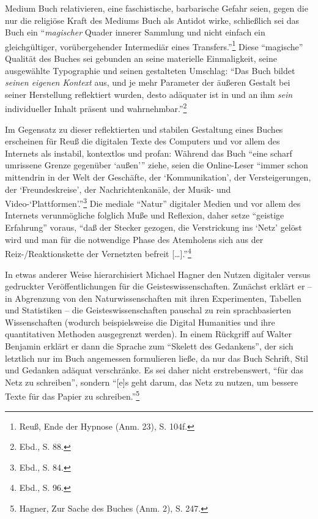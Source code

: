 \documentclass[a4paper,
fontsize=11pt,
oneside,
numbers=noperiodatend,
parskip=half-,
bibliography=totoc,
final
]{scrartcl}
\begin{document}
Medium Buch relativieren, eine faschistische, barbarische Gefahr seien,
gegen die nur die religiöse Kraft des Mediums Buch als Antidot wirke,
schließlich sei das Buch ein \enquote{\emph{magischer} Quader innerer
Sammlung und nicht einfach ein gleichgültiger, vorübergehender
Intermediär eines Transfers.}\footnote{Reuß, Ende der Hypnose (Anm. 23),
  S. 104f.} Diese \enquote{magische} Qualität des Buches sei gebunden an
seine materielle Einmaligkeit, seine ausgewählte Typographie und seinen
gestalteten Umschlag: \enquote{Das Buch bildet \emph{seinen eigenen
Kontext} aus, und je mehr Parameter der äußeren Gestalt bei seiner
Herstellung reflektiert wurden, desto adäquater ist in und an ihm
\emph{sein} individueller Inhalt präsent und wahrnehmbar.}\footnote{Ebd.,
  S. 88.}

Im Gegensatz zu dieser reflektierten und stabilen Gestaltung eines
Buches erscheinen für Reuß die digitalen Texte des Computers und vor
allem des Internets als instabil, kontextlos und profan: Während das
Buch \enquote{eine scharf umrissene Grenze gegenüber \enquote{außen}}
ziehe, seien die Online-Leser \enquote{immer schon mittendrin in der
Welt der Geschäfte, der \enquote{Kommunikation}, der Versteigerungen,
der \enquote{Freundeskreise}, der Nachrichtenkanäle, der Musik- und
Video-\enquote{Plattformen}.}\footnote{Ebd., S. 84.} Die mediale
\enquote{Natur} digitaler Medien und vor allem des Internets
verunmögliche folglich Muße und Reflexion, daher setze \enquote{geistige
Erfahrung} voraus, \enquote{daß der Stecker gezogen, die Verstrickung
ins \enquote{Netz} gelöst wird und man für die notwendige Phase des
Atemholens sich aus der Reiz-/Reaktionskette der Vernetzten befreit
{[}\ldots{}{]}.}\footnote{Ebd., S. 96.}

In etwas anderer Weise hierarchisiert Michael Hagner den Nutzen
digitaler versus gedruckter Veröffentlichungen für die
Geisteswissenschaften. Zunächst erklärt er -- in Abgrenzung von den
Naturwissenschaften mit ihren Experimenten, Tabellen und Statistiken --
die Geisteswissenschaften pauschal zu rein sprachbasierten
Wissenschaften (wodurch beispielsweise die Digital Humanities und ihre
quantitativen Methoden ausgegrenzt werden). In einem Rückgriff auf
Walter Benjamin erklärt er dann die Sprache zum \enquote{Skelett des
Gedankens}, der sich letztlich nur im Buch angemessen formulieren ließe,
da nur das Buch Schrift, Stil und Gedanken adäquat verschränke. Es sei
daher nicht erstrebenswert, \enquote{für das Netz zu schreiben}, sondern
\enquote{{[}e{]}s geht darum, das Netz zu nutzen, um bessere Texte für
das Papier zu schreiben.}\footnote{Hagner, Zur Sache des Buches (Anm.
  2), S. 247.}
\end{document}
